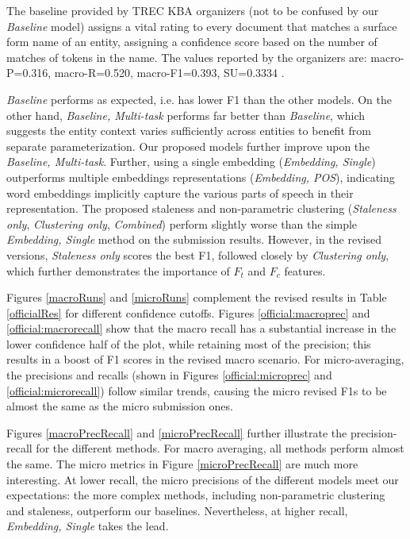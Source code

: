 \documentclass{article}
\begin{document}
The baseline provided by TREC KBA organizers (not to be confused by our \emph{Baseline} model) assigns a vital rating to every document that matches a surface form name of an entity, assigning a confidence score based on the number of matches of tokens in the name. The values reported by the organizers are: macro-P=0.316, macro-R=0.520, macro-F1=0.393, SU=0.3334 \cite{frank14:overview}.

{\textit{Baseline}} performs as expected, i.e. has lower F1 than the other models.
On the other hand, {\textit{Baseline, Multi-task}} performs far better than {\textit{Baseline}}, which suggests the entity context varies sufficiently across entities to benefit from separate parameterization.
Our proposed models further improve upon the {\textit{Baseline, Multi-task}}. 
Further, using a single embedding ({\textit{Embedding, Single}}) outperforms multiple embeddings representations ({\textit{Embedding, POS}}), indicating word embeddings implicitly capture the various parts of speech in their representation.
The proposed staleness and non-parametric clustering ({\textit{Staleness only}}, {\textit{Clustering only}}, {\textit{Combined}}) perform slightly worse than the simple {\textit{Embedding, Single}} method on the submission results. 
However, in the revised versions, {\textit{Staleness only}} scores the best F1, followed closely by {\textit{Clustering only}}, which further demonstrates the importance of $F_t$ and $F_c$ features.

Figures \ref{macroRuns} and \ref{microRuns} complement the revised results in Table \ref{officialRes} for different confidence cutoffs. Figures \ref{official:macroprec} and \ref{official:macrorecall} show that the macro recall has a substantial increase in the lower confidence half of the plot, while retaining most of the precision; this results in a boost of F1 scores in the revised macro scenario.
For micro-averaging, the precisions and recalls (shown in Figures \ref{official:microprec} and \ref{official:microrecall}) follow similar trends, causing the micro revised F1s to be almost the same as the micro submission ones. 

Figures \ref{macroPrecRecall} and \ref{microPrecRecall} further illustrate the precision-recall for the different methods. For macro averaging, all methods perform almost the same. The micro metrics in Figure \ref{microPrecRecall} are much more interesting. At lower recall, the micro precisions of the different models meet our expectations: the more complex methods, including non-parametric clustering and staleness, outperform our baselines. Nevertheless, at higher recall, {\textit{Embedding, Single}} takes the lead.
\end{document}
